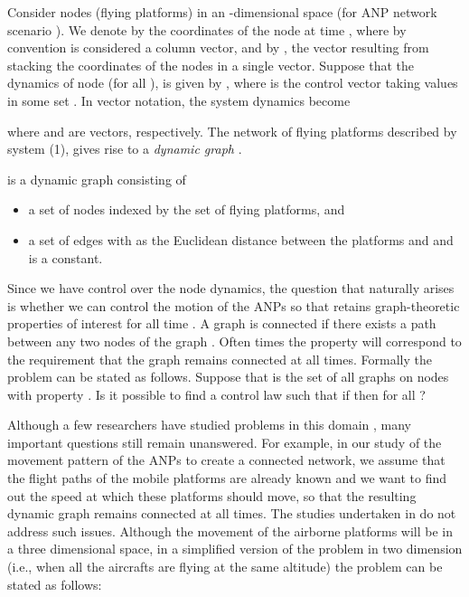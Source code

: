 \documentclass[10pt]{IEEEtran}
\begin{document}
Consider  nodes (flying platforms) in an -dimensional space  (for ANP network scenario ). We denote by  the coordinates of the node  at time , where by convention  is considered a  column vector, and by , the  vector resulting from stacking the coordinates of the
nodes in a single vector. Suppose that the dynamics of node  (for all ), is given by , where  is the control vector taking values in some set . In vector notation, the system dynamics become


where  and  are  vectors, respectively. The network of flying platforms described by system (1), gives rise to a {\em dynamic graph} .

 is a dynamic graph consisting of

\begin{itemize}
\item a set of nodes  indexed by the set of flying platforms, and\vspace{-0.0in}
\item a set of edges  with  as the Euclidean distance between the platforms  and  and  is a constant.
\end{itemize}

Since we have control over the node dynamics, the question that naturally arises is whether we can control the motion of the ANPs so that  retains graph-theoretic properties of interest  for all time . A graph  is connected if there exists a path between any two nodes of the graph . Often times the property  will correspond to the requirement that the graph  remains connected at all times.  Formally the problem can be stated as follows. Suppose that  is the set of all graphs on  nodes with property . Is it possible to find a control law  such that if  then  for all ?

Although a few researchers have studied problems in this domain \cite{Mesbahi051, Mesbahi052, Zav07}, many important questions still remain unanswered. For example, in our study of the movement pattern of the ANPs to create a connected network, we assume that the flight paths of the mobile platforms are already known and we want to find out the speed at which these platforms should move, so that the resulting dynamic graph remains connected at all times. The studies undertaken in \cite{Mesbahi051,Mesbahi052,Zav07} do not address such issues. Although the movement of the airborne platforms will be in a three dimensional space, in a  simplified version of the problem in two dimension (i.e., when all the aircrafts are flying at the same altitude) the problem can be stated as follows:
\end{document}
